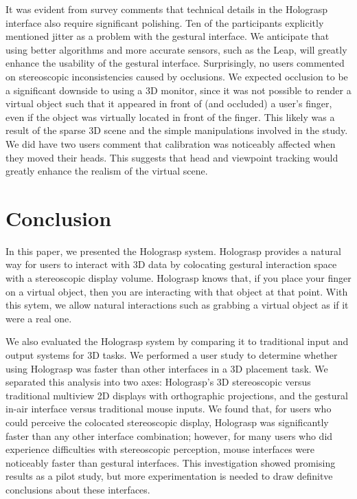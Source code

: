 \documentclass[pageno]{jpaper}
\begin{document}
It was evident from survey comments that technical details in the Holograsp interface also require significant
polishing. Ten of the participants explicitly mentioned jitter as a problem with the gestural interface. We anticipate
that using better algorithms and more accurate sensors, such as the Leap, will greatly enhance the usability of the
gestural interface. Surprisingly, no users commented on stereoscopic inconsistencies caused by occlusions. We expected
occlusion to be a significant downside to using a 3D monitor, since it was not possible to render a virtual object such that it appeared in front
of (and occluded) a user's finger, even if the object was virtually located in front of the finger. This likely was a result of the sparse 3D
scene and the simple manipulations involved in the study. We did have two users comment that calibration
was noticeably affected when they moved their heads. This suggests that head and viewpoint tracking would greatly enhance the 
realism of the virtual scene.

\section{Conclusion}
In this paper, we presented the Holograsp system. Holograsp provides a natural way for users to interact with 3D data by colocating gestural interaction
space with a stereoscopic display volume. Holograsp knows that, if you place your finger on a virtual object, then you are interacting with that object at
that point. With this sytem, we allow natural interactions such as grabbing a virtual object as if it were a real one.

We also evaluated the Holograsp system by comparing it to traditional input and output systems for 3D tasks. We performed a user study to determine whether
using Holograsp was faster than other interfaces in a 3D placement task. We separated this analysis into two axes: Holograsp's 3D stereoscopic
versus traditional multiview 2D displays with orthographic projections, and the gestural in-air interface versus traditional mouse inputs. We
found that, for users who could perceive the colocated stereoscopic display, Holograsp was significantly faster than any other interface combination;
however, for many users who did experience difficulties with stereoscopic perception, mouse interfaces were noticeably faster than gestural interfaces.
This investigation showed promising results as a pilot study, but more experimentation is needed to draw definitve conclusions about these interfaces.
\end{document}
